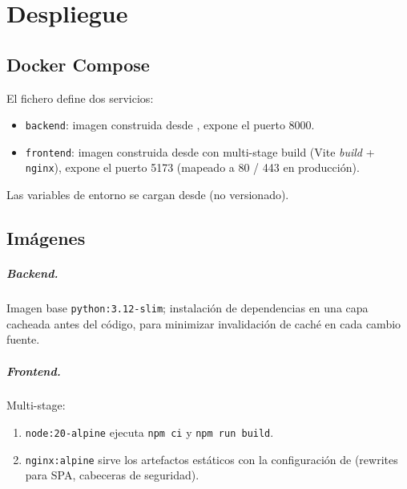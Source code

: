 \chapter{Despliegue}\label{cap:despliegue}

\section{Docker Compose}

El fichero  define dos servicios:

\begin{itemize}[leftmargin=*,itemsep=0.2em]
  \item \texttt{backend}: imagen construida desde
        , expone el puerto 8000.
  \item \texttt{frontend}: imagen construida desde
         con multi-stage build
        (Vite \emph{build} + \texttt{nginx}), expone el puerto 5173
        (mapeado a 80 / 443 en producción).
\end{itemize}

Las variables de entorno se cargan desde  (no
versionado).

\section{Imágenes}

\paragraph{Backend.} Imagen base \texttt{python:3.12-slim};
instalación de dependencias en una capa cacheada antes del código,
para minimizar invalidación de caché en cada cambio fuente.

\paragraph{Frontend.} Multi-stage:
\begin{enumerate}[leftmargin=*,itemsep=0.2em]
  \item \texttt{node:20-alpine} ejecuta \texttt{npm ci} y
        \texttt{npm run build}.
  \item \texttt{nginx:alpine} sirve los artefactos estáticos con la
        configuración de  (rewrites para SPA,
        cabeceras de seguridad).
\end{enumerate}

